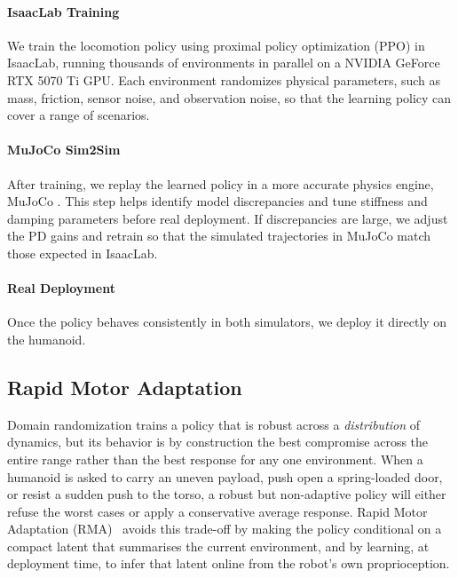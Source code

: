 \paragraph{IsaacLab Training}
\label{sec:isaaclab}
We train the locomotion policy using proximal policy optimization (PPO) in IsaacLab, running thousands of environments in parallel on a NVIDIA GeForce RTX 5070 Ti GPU. Each environment randomizes physical parameters, such as mass, friction, sensor noise, and observation noise, so that the learning policy can cover a range of scenarios. 

\paragraph{MuJoCo Sim2Sim}
\label{sec:mujoco}
After training, we replay the learned policy in a more accurate physics engine, MuJoCo  \citep{gu2024humanoidgymreinforcementlearninghumanoid}. This step helps identify model discrepancies and tune stiffness and damping parameters before real deployment. If discrepancies are large, we adjust the PD gains and retrain so that the simulated trajectories in MuJoCo match those expected in IsaacLab. 

\paragraph{Real Deployment}
\label{sec:real}

Once the policy behaves consistently in both simulators, we deploy it directly on the humanoid. 





\subsection{Rapid Motor Adaptation}
\label{sec:rma}

Domain randomization trains a policy that is robust across a \emph{distribution}
of dynamics, but its behavior is by construction the best compromise across the
entire range rather than the best response for any one environment. When a
humanoid is asked to carry an uneven payload, push open a spring-loaded door,
or resist a sudden push to the torso, a robust but non-adaptive policy will
either refuse the worst cases or apply a conservative average response. Rapid
Motor Adaptation (RMA)~\citep{kumar2021rmarapidmotoradaptation} avoids this
trade-off by making the policy conditional on a compact latent that summarises
the current environment, and by learning, at deployment time, to infer that
latent online from the robot's own proprioception.

